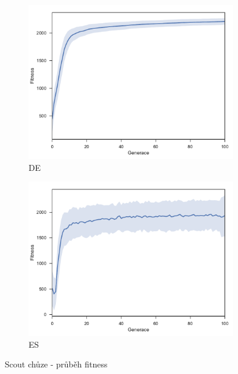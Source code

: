 	\begin{figure}[p]
		\centering
		\begin{subfigure}{.5\textwidth}
			\centering
			\includegraphics[width=\linewidth]{../img/WoodMap/DE/WCuttorWalkMem}
			\caption{DE}
			\label{obr04:WalkDE}
		\end{subfigure}%
		\begin{subfigure}{.5\textwidth}
			\centering
			\includegraphics[width=\linewidth]{../img/WoodMap/ES/WoodWalkES}
			\caption{ES}
			\label{obr04:WalkES}
		\end{subfigure}
		\caption{Scout chůze - průběh fitness }
		\label{obr04:Walk}
	\end{figure}
	\clearpage
	
